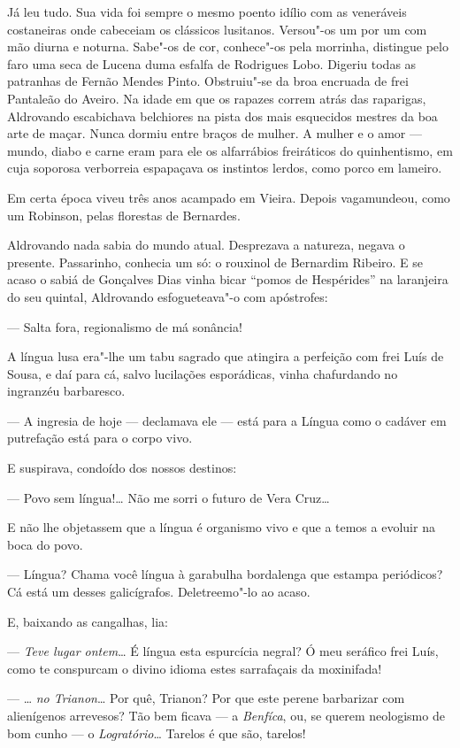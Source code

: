 Já leu tudo. Sua vida foi sempre o mesmo poento idílio com as veneráveis
costaneiras onde cabeceiam os clássicos lusitanos. Versou"-os um por um
com mão diurna e noturna. Sabe"-os de cor, conhece"-os pela morrinha,
distingue pelo faro uma seca de Lucena duma esfalfa de Rodrigues Lobo.
Digeriu todas as patranhas de Fernão Mendes Pinto. Obstruiu"-se da broa
encruada de frei Pantaleão do Aveiro. Na idade em que os rapazes correm
atrás das raparigas, Aldrovando escabichava belchiores na pista dos mais
esquecidos mestres da boa arte de maçar. Nunca dormiu entre braços de
mulher. A mulher e o amor --- mundo, diabo e carne eram para ele os
alfarrábios freiráticos do quinhentismo, em cuja soporosa verborreia
espapaçava os instintos lerdos, como porco em lameiro.

Em certa época viveu três anos acampado em Vieira. Depois vagamundeou,
como um Robinson, pelas florestas de Bernardes.

Aldrovando nada sabia do mundo atual. Desprezava a natureza, negava o
presente. Passarinho, conhecia um só: o rouxinol de Bernardim Ribeiro. E
se acaso o sabiá de Gonçalves Dias vinha bicar ``pomos de Hespérides''
na laranjeira do seu quintal, Aldrovando esfogueteava"-o com apóstrofes:

--- Salta fora, regionalismo de má sonância!

A língua lusa era"-lhe um tabu sagrado que atingira a perfeição com frei
Luís de Sousa, e daí para cá, salvo lucilações esporádicas, vinha
chafurdando no ingranzéu barbaresco.

--- A ingresia de hoje --- declamava ele --- está para a Língua como o
cadáver em putrefação está para o corpo vivo.

E suspirava, condoído dos nossos destinos:

--- Povo sem língua!\ldots{} Não me sorri o futuro de Vera Cruz\ldots{}

E não lhe objetassem que a língua é organismo vivo e que a temos a
evoluir na boca do povo.

--- Língua? Chama você língua à garabulha bordalenga que estampa
periódicos? Cá está um desses galicígrafos. Deletreemo"-lo ao acaso.

E, baixando as cangalhas, lia:

--- \emph{Teve lugar ontem}\ldots{} É língua esta espurcícia negral? Ó meu
seráfico frei Luís, como te conspurcam o divino idioma estes sarrafaçais
da moxinifada!

--- \ldots{} \emph{no Trianon}\ldots{} Por quê, Trianon? Por que este perene
barbarizar com alienígenos arrevesos? Tão bem ficava --- a
\emph{Benfíca}, ou, se querem neologismo de bom cunho --- o
\emph{Logratório}\ldots{} Tarelos é que são, tarelos!

